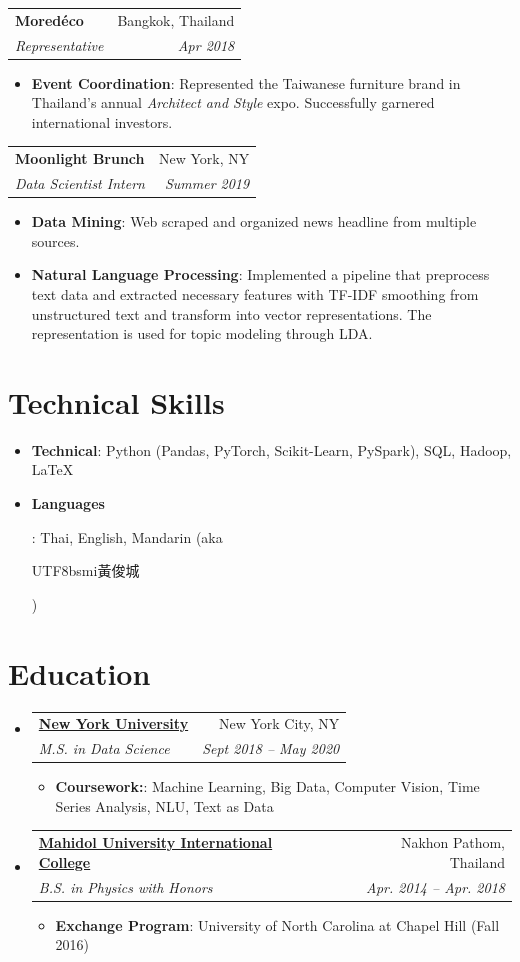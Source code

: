 \documentclass[letterpaper,11pt]{article}
\makeatletter
\newcommand{\resumeItem}[2]{
  \item\small{
    \textbf{#1}{: #2 \vspace{-2pt}}
  }
}
\newcommand{\resumeSubheading}[4]{
  \vspace{-1pt}\item
    \begin{tabular*}{0.97\textwidth}{l@{\extracolsep{\fill}}r}
      \textbf{#1} & \small{#2} \\
      \textit{\small#3} & \textit{\small #4} \\
    \end{tabular*}\vspace{-5pt}
}
\newcommand{\resumeSubHeadingListStart}{\begin{itemize}[leftmargin=*]}
\newcommand{\resumeSubHeadingListEnd}{\end{itemize}}
\newcommand{\resumeItemListStart}{\begin{itemize}}
\newcommand{\resumeItemListEnd}{\end{itemize}\vspace{-1pt}}
\makeatother
\begin{document}
\resumeSubheading{Mored\'{e}co}{Bangkok, Thailand}{Representative}{Apr 2018}
   	\resumeItemListStart
		\resumeItem{Event Coordination}{Represented the Taiwanese furniture brand in Thailand's  annual \textit{Architect and Style} expo. Successfully garnered international investors.}
   	\resumeItemListEnd
   	
\resumeSubheading{Moonlight Brunch}{New York, NY}{Data Scientist Intern}{Summer 2019}
   	\resumeItemListStart
   		\resumeItem{Data Mining}{Web scraped and organized news headline from multiple sources.}
        \resumeItem{Natural Language Processing}{Implemented a pipeline that preprocess text data and extracted necessary features with TF-IDF smoothing from unstructured text and transform into vector representations. The representation is used for topic modeling through LDA.}
\fi

\resumeSubHeadingListEnd

\section{Technical Skills}
 \resumeSubHeadingListStart
   \resumeItem{
     \textbf{Technical}}{Python (\footnotesize{Pandas, PyTorch, Scikit-Learn, PySpark}), SQL, Hadoop, \LaTeX}
\resumeItem{
     \textbf{Languages}}{\normalfont  Thai, English, Mandarin \scriptsize (aka \begin{CJK*}{UTF8}{bsmi}黃俊城\end{CJK*})}
 \resumeSubHeadingListEnd

\section{Education}
  \resumeSubHeadingListStart
    \resumeSubheading
      {\href{https://cds.nyu.edu/}{\color{Black}New York University}}{New York City, NY}
      {M.S. in Data Science}{Sept 2018 -- \textit{May 2020}}
        \resumeItemListStart
            \resumeItem{Coursework:}
                {Machine Learning, Big Data, Computer Vision, Time Series Analysis, NLU,  Text as Data}
        \resumeItemListEnd
    \resumeSubheading
      {\href{https://muic.mahidol.ac.th/eng/programs/undergraduate-programs/science/physics/}{\color{Black} Mahidol University International College}}{Nakhon Pathom, Thailand}
      {B.S. in Physics with Honors}{Apr. 2014 -- Apr. 2018}
      \resumeItemListStart
            \resumeItem{Exchange Program}
                {University of North Carolina at Chapel Hill (Fall 2016)}
        \resumeItemListEnd
  \resumeSubHeadingListEnd
  
\end{document}
